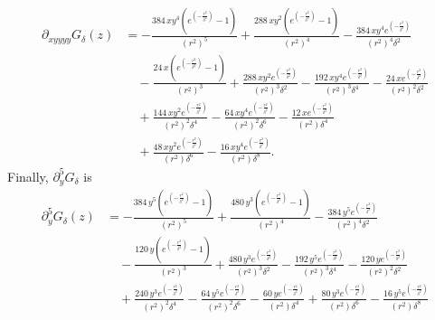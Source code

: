 \documentclass[12pt]{amsart}
\begin{document}
\begin{align*}
  \partial_{xyyyy}G_\delta(z) &= 
  - \frac{384 \, x y^{4} {\left(e^{\left(-\frac{r^{2}}{\delta^{2}}\right)} - 1\right)}}{{\left(r^{2}\right)}^{5}} 
  + \frac{288 \, x y^{2} {\left(e^{\left(-\frac{r^{2}}{\delta^{2}}\right)} - 1\right)}}{{\left(r^{2}\right)}^{4}} 
  - \frac{384 \, x y^{4} e^{\left(-\frac{r^{2}}{\delta^{2}}\right)}}{{\left(r^{2}\right)}^{4} \delta^{2}} \\
  &\quad - \frac{24 \, x {\left(e^{\left(-\frac{r^{2}}{\delta^{2}}\right)} - 1\right)}}{{\left(r^{2}\right)}^{3}} 
  + \frac{288 \, x y^{2} e^{\left(-\frac{r^{2}}{\delta^{2}}\right)}}{{\left(r^{2}\right)}^{3} \delta^{2}} 
  - \frac{192 \, x y^{4} e^{\left(-\frac{r^{2}}{\delta^{2}}\right)}}{{\left(r^{2}\right)}^{3} \delta^{4}} 
  - \frac{24 \, x e^{\left(-\frac{r^{2}}{\delta^{2}}\right)}}{{\left(r^{2}\right)}^{2} \delta^{2}} \\
  &\quad + \frac{144 \, x y^{2} e^{\left(-\frac{r^{2}}{\delta^{2}}\right)}}{{\left(r^{2}\right)}^{2} \delta^{4}} 
  - \frac{64 \, x y^{4} e^{\left(-\frac{r^{2}}{\delta^{2}}\right)}}{{\left(r^{2}\right)}^{2} \delta^{6}} 
  - \frac{12 \, x e^{\left(-\frac{r^{2}}{\delta^{2}}\right)}}{{\left(r^{2}\right)} \delta^{4}} \\
  &\quad + \frac{48 \, x y^{2} e^{\left(-\frac{r^{2}}{\delta^{2}}\right)}}{{\left(r^{2}\right)} \delta^{6}} 
  - \frac{16 \, x y^{4} e^{\left(-\frac{r^{2}}{\delta^{2}}\right)}}{{\left(r^{2}\right)} \delta^{8}}.
\end{align*}
Finally, $\partial_y^5 G_\delta$ is
\begin{align*}
  \partial_y^5 G_\delta(z) &= 
  -\frac{384 \, y^{5} {\left(e^{\left(-\frac{r^{2}}{\delta^{2}}\right)} - 1\right)}}{{\left(r^{2}\right)}^{5}} 
  + \frac{480 \, y^{3} {\left(e^{\left(-\frac{r^{2}}{\delta^{2}}\right)} - 1\right)}}{{\left(r^{2}\right)}^{4}} 
  - \frac{384 \, y^{5} e^{\left(-\frac{r^{2}}{\delta^{2}}\right)}}{{\left(r^{2}\right)}^{4} \delta^{2}} \\
  &\quad - \frac{120 \, y {\left(e^{\left(-\frac{r^{2}}{\delta^{2}}\right)} - 1\right)}}{{\left(r^{2}\right)}^{3}} 
  + \frac{480 \, y^{3} e^{\left(-\frac{r^{2}}{\delta^{2}}\right)}}{{\left(r^{2}\right)}^{3} \delta^{2}} 
  - \frac{192 \, y^{5} e^{\left(-\frac{r^{2}}{\delta^{2}}\right)}}{{\left(r^{2}\right)}^{3} \delta^{4}} 
  - \frac{120 \, y e^{\left(-\frac{r^{2}}{\delta^{2}}\right)}}{{\left(r^{2}\right)}^{2} \delta^{2}} \\
  &\quad + \frac{240 \, y^{3} e^{\left(-\frac{r^{2}}{\delta^{2}}\right)}}{{\left(r^{2}\right)}^{2} \delta^{4}} 
  - \frac{64 \, y^{5} e^{\left(-\frac{r^{2}}{\delta^{2}}\right)}}{{\left(r^{2}\right)}^{2} \delta^{6}} 
  - \frac{60 \, y e^{\left(-\frac{r^{2}}{\delta^{2}}\right)}}{{\left(r^{2}\right)} \delta^{4}} 
  + \frac{80 \, y^{3} e^{\left(-\frac{r^{2}}{\delta^{2}}\right)}}{{\left(r^{2}\right)} \delta^{6}} 
  - \frac{16 \, y^{5} e^{\left(-\frac{r^{2}}{\delta^{2}}\right)}}{{\left(r^{2}\right)} \delta^{8}}
\end{align*}
\end{document}
